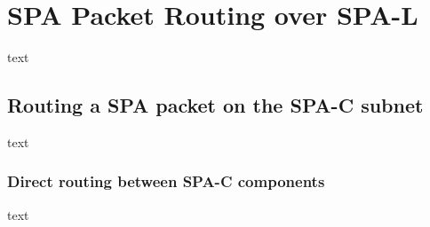 \section{SPA Packet Routing over SPA-L}\label{ch:spa_routing}
text
\subsection{Routing a SPA packet on the SPA-C subnet}
text
\subsubsection{Direct routing between SPA-C components}
text
